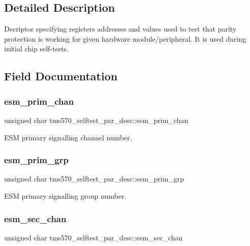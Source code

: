 \subsection{Detailed Description}
Decriptor specifying registers addresses and values used to test that parity protection is working for given hardware module/peripheral. It is used during initial chip self-\/tests. 

\subsection{Field Documentation}
\mbox{\label{structtms570__selftest__par__desc_ac800a521c60550f15d2dd8f6a4ee679a}} 
\subsubsection{\texorpdfstring{esm\_prim\_chan}{esm\_prim\_chan}}
{\footnotesize\ttfamily unsigned char tms570\+\_\+selftest\+\_\+par\+\_\+desc\+::esm\+\_\+prim\+\_\+chan}

E\+SM primary signalling channel number. \mbox{\label{structtms570__selftest__par__desc_a38968c33aa222c2d8f68683da796fbb7}} 
\subsubsection{\texorpdfstring{esm\_prim\_grp}{esm\_prim\_grp}}
{\footnotesize\ttfamily unsigned char tms570\+\_\+selftest\+\_\+par\+\_\+desc\+::esm\+\_\+prim\+\_\+grp}

E\+SM primary signalling group number. \mbox{\label{structtms570__selftest__par__desc_a68e1575df4557ec24ac01bbf0743ae0d}} 
\subsubsection{\texorpdfstring{esm\_sec\_chan}{esm\_sec\_chan}}
{\footnotesize\ttfamily unsigned char tms570\+\_\+selftest\+\_\+par\+\_\+desc\+::esm\+\_\+sec\+\_\+chan}


